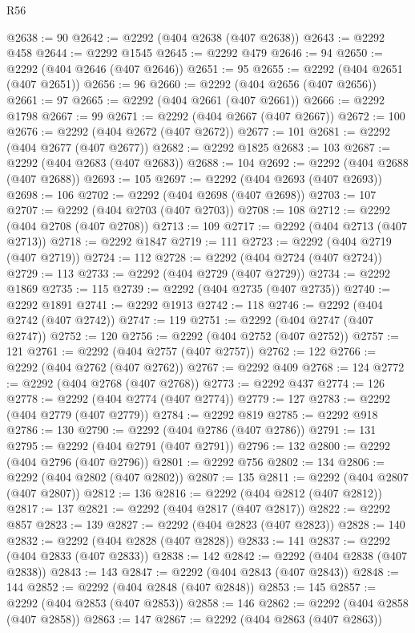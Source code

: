 \begin{lexlean}{R56}
\begin{coremodule}
@2638 := 90
@2642 := @2292 (@404 @2638 (@407 @2638))
@2643 := @2292 @458
@2644 := @2292 @1545
@2645 := @2292 @479
@2646 := 94
@2650 := @2292 (@404 @2646 (@407 @2646))
@2651 := 95
@2655 := @2292 (@404 @2651 (@407 @2651))
@2656 := 96
@2660 := @2292 (@404 @2656 (@407 @2656))
@2661 := 97
@2665 := @2292 (@404 @2661 (@407 @2661))
@2666 := @2292 @1798
@2667 := 99
@2671 := @2292 (@404 @2667 (@407 @2667))
@2672 := 100
@2676 := @2292 (@404 @2672 (@407 @2672))
@2677 := 101
@2681 := @2292 (@404 @2677 (@407 @2677))
@2682 := @2292 @1825
@2683 := 103
@2687 := @2292 (@404 @2683 (@407 @2683))
@2688 := 104
@2692 := @2292 (@404 @2688 (@407 @2688))
@2693 := 105
@2697 := @2292 (@404 @2693 (@407 @2693))
@2698 := 106
@2702 := @2292 (@404 @2698 (@407 @2698))
@2703 := 107
@2707 := @2292 (@404 @2703 (@407 @2703))
@2708 := 108
@2712 := @2292 (@404 @2708 (@407 @2708))
@2713 := 109
@2717 := @2292 (@404 @2713 (@407 @2713))
@2718 := @2292 @1847
@2719 := 111
@2723 := @2292 (@404 @2719 (@407 @2719))
@2724 := 112
@2728 := @2292 (@404 @2724 (@407 @2724))
@2729 := 113
@2733 := @2292 (@404 @2729 (@407 @2729))
@2734 := @2292 @1869
@2735 := 115
@2739 := @2292 (@404 @2735 (@407 @2735))
@2740 := @2292 @1891
@2741 := @2292 @1913
@2742 := 118
@2746 := @2292 (@404 @2742 (@407 @2742))
@2747 := 119
@2751 := @2292 (@404 @2747 (@407 @2747))
@2752 := 120
@2756 := @2292 (@404 @2752 (@407 @2752))
@2757 := 121
@2761 := @2292 (@404 @2757 (@407 @2757))
@2762 := 122
@2766 := @2292 (@404 @2762 (@407 @2762))
@2767 := @2292 @409
@2768 := 124
@2772 := @2292 (@404 @2768 (@407 @2768))
@2773 := @2292 @437
@2774 := 126
@2778 := @2292 (@404 @2774 (@407 @2774))
@2779 := 127
@2783 := @2292 (@404 @2779 (@407 @2779))
@2784 := @2292 @819
@2785 := @2292 @918
@2786 := 130
@2790 := @2292 (@404 @2786 (@407 @2786))
@2791 := 131
@2795 := @2292 (@404 @2791 (@407 @2791))
@2796 := 132
@2800 := @2292 (@404 @2796 (@407 @2796))
@2801 := @2292 @756
@2802 := 134
@2806 := @2292 (@404 @2802 (@407 @2802))
@2807 := 135
@2811 := @2292 (@404 @2807 (@407 @2807))
@2812 := 136
@2816 := @2292 (@404 @2812 (@407 @2812))
@2817 := 137
@2821 := @2292 (@404 @2817 (@407 @2817))
@2822 := @2292 @857
@2823 := 139
@2827 := @2292 (@404 @2823 (@407 @2823))
@2828 := 140
@2832 := @2292 (@404 @2828 (@407 @2828))
@2833 := 141
@2837 := @2292 (@404 @2833 (@407 @2833))
@2838 := 142
@2842 := @2292 (@404 @2838 (@407 @2838))
@2843 := 143
@2847 := @2292 (@404 @2843 (@407 @2843))
@2848 := 144
@2852 := @2292 (@404 @2848 (@407 @2848))
@2853 := 145
@2857 := @2292 (@404 @2853 (@407 @2853))
@2858 := 146
@2862 := @2292 (@404 @2858 (@407 @2858))
@2863 := 147
@2867 := @2292 (@404 @2863 (@407 @2863))

\end{coremodule}
\end{lexlean}

